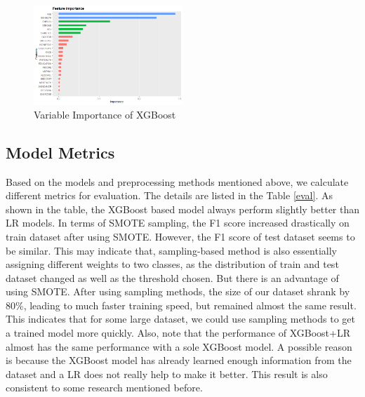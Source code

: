 \documentclass[11pt]{article}
\begin{document}
\begin{figure}
\centering
\includegraphics[width=0.5\textwidth]{XGBoost.png}
\caption{Variable Importance of XGBoost}
\label{xgb}
\end{figure}

\subsection{Model Metrics}
Based on the models and preprocessing methods mentioned above, we calculate different metrics for evaluation. The details are listed in the Table \ref{eval}. As shown in the table, the XGBoost based model always perform slightly better than LR models. In terms of SMOTE sampling, the F1 score increased drastically on train dataset after using SMOTE. However, the F1 score of test dataset seems to be similar. This may indicate that, sampling-based method is also essentially assigning different weights to two classes, as the distribution of train and test dataset changed as well as the threshold chosen. But there is an advantage of using SMOTE. After using sampling methods, the size of our dataset shrank by 80\%, leading to much faster training speed, but remained almost the same result. This indicates that for some large dataset, we could use sampling methods to get a trained model more quickly. Also, note that the performance of XGBoost+LR almost has the same performance with a sole XGBoost model. A possible reason is because the XGBoost model has already learned enough information from the dataset and a LR does not really help to make it better. This result is also consistent to some research mentioned before.
\end{document}
